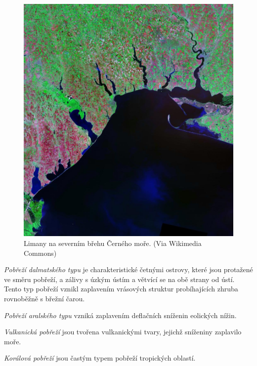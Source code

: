 \begin{figure}[h]
	\centering
	\includegraphics[width=1\linewidth]{obrazky/marine/Limans}
	\caption{Limany na severním břehu Černého moře. (Via Wikimedia Commons)}
	\label{fig:limans}
\end{figure}

\emph{Pobřeží dalmatského typu} je charakteristické četnými ostrovy, které jsou protažené ve směru pobřeží, a zálivy s úzkým ústím a větvící se na obě strany od ústí. Tento typ pobřeží vznikl zaplavením vrásových struktur probíhajících zhruba rovnoběžně s břežní čarou. 

\emph{Pobřeží aralského typu} vzniká zaplavením deflačních sníženin eolických nížin.

\emph{Vulkanická pobřeží} jsou tvořena vulkanickými tvary, jejichž sníženiny zaplavilo moře. 

\emph{Korálová pobřeží} jsou častým typem pobřeží tropických oblastí. 

%
%


